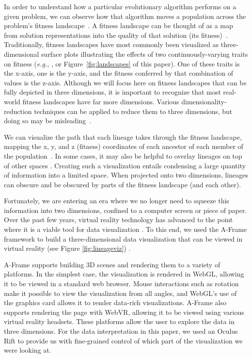 \documentclass[letterpaper]{article}
\begin{document}
In order to understand how a particular evolutionary algorithm performs on a given problem, we can observe how that algorithm moves a population across the problem's fitness landscape~\citep{kauffman_towards_1987}. A fitness landscape can be thought of as a map from solution representations into the quality of that solution (its fitness)~\citep{wright_roles_1932}.  Traditionally, fitness landscapes have most commonly been visualized as three-dimensional surface plots illustrating the effects of two continuously-varying traits on fitness (\textit{e.g.}, \citealp{li_benchmark_2013}, or Figure~\ref{fig:landscapes} of this paper). One of these traits is the x-axis, one is the y-axis, and the fitness conferred by that combination of values is the z-axis. Although we will focus here on fitness landscapes that can be fully depicted in three dimensions, it is important to recognize that most real-world fitness landscapes have far more dimensions. Various dimensionality-reduction techniques can be applied to reduce them to three dimensions, but doing so may be misleading~\citep{pigliucci_high-dimensional_2010}.

We can visualize the path that each lineage takes through the fitness landscape, mapping the x, y, and z (fitness) coordinates of each ancestor of each member of the population~\citep{virgo_lineage_2017}. In some cases, it may also be helpful to overlay lineages on top of other spaces \citep{dolson_spatial_2017-1, mouret_illuminating_2015}. Creating such a visualization entails condensing a large quantity of information into a limited space. When projected onto two dimensions, lineages can obscure and be obscured by parts of the fitness landscape (and each other). 

Fortunately, we are entering an era where we no longer need to squeeze this information into two dimensions, confined to a computer screen or piece of paper. Over the past few years, virtual reality technology has advanced to the point where it is a viable tool for data visualization \citep{van_dam_experiments_2002,olshannikova_visualizing_2015}. To this end, we used the A-Frame framework \citep{aframe} to build a three-dimensional data visualization that can be viewed in virtual reality (see Figure \ref{fig:lineageviz}) \citep{dolson_visualizing_2018}.

A-Frame supports building 3D scenes and rendering them to a variety of platforms. In the simplest case, the visualization is rendered in WebGL, allowing it to be viewed in a standard web browser. Mouse interactions such as rotation make it possible to view the visualization from all angles, and WebGL's use of the graphics card allows it to render data-rich visualizations. A-Frame also supports rendering the page with WebVR, allowing it to be viewed using various virtual reality headsets. These platforms allow the user to explore the data in three dimensions. For the data interpretation in this paper, we used an Oculus Rift to provide us with fine-grained control of which part of the visualization we were looking at. 
\end{document}
